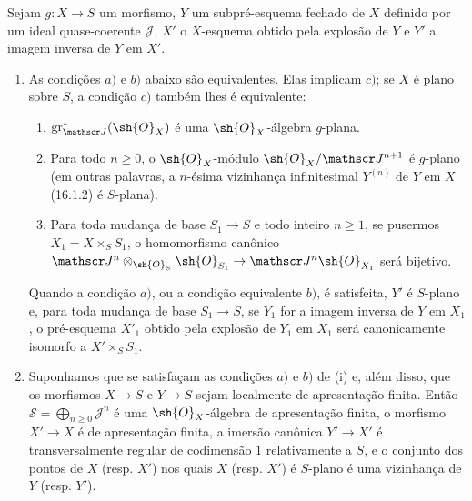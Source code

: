 \begin{proposition}[19.4.6]
\label{IV.19.4.6}
Sejam $g:X\to S$ um morfismo, $Y$ um subpré-esquema fechado de $X$ definido por um ideal quase-coerente $\mathscr J$, $X'$ o $X$-esquema obtido pela explosão de $Y$ e $Y'$ a imagem inversa de $Y$ em $X'$.
\begin{enumerate}
  \item[(i)] As condições $a)$ e $b)$ abaixo são equivalentes. Elas implicam $c)$; se $X$ é plano sobre $S$, a condição $c)$ também lhes é equivalente:
  \begin{enumerate}
    \item[a)] $\operatorname{gr}_{\mathscr J}^*(\sh{O}_X)$ é uma $\sh{O}_X$-álgebra $g$-plana.
    \item[b)] Para todo $n\geq0$, o $\sh{O}_X$-módulo $\sh{O}_X/\mathscr J^{n+1}$ é $g$-plano (em outras palavras, a $n$-ésima vizinhança infinitesimal $Y^{(n)}$ de $Y$ em $X$ (16.1.2) é $S$-plana).
    \item[c)] Para toda mudança de base $S_1\to S$ e todo inteiro $n\geq1$, se pusermos $X_1=X\times_S S_1$, o homomorfismo canônico $\mathscr J^n\otimes_{\sh{O}_S}\sh{O}_{S_1}\to\mathscr J^n\sh{O}_{X_1}$ será bijetivo.
  \end{enumerate}
  Quando a condição $a)$, ou a condição equivalente $b)$, é satisfeita, $Y'$ é $S$-plano e, para toda mudança de base $S_1\to S$, se $Y_1$ for a imagem inversa de $Y$ em $X_1$, o pré-esquema $X'_1$ obtido pela explosão de $Y_1$ em $X_1$ será canonicamente isomorfo a $X'\times_S S_1$.
  \item[(ii)] Suponhamos que se satisfaçam as condições $a)$ e $b)$ de (i) e, além disso, que os morfismos $X\to S$ e $Y\to S$ sejam localmente de apresentação finita. Então $\mathscr S=\bigoplus_{n\geq0}\mathscr J^n$ é uma $\sh{O}_X$-álgebra de apresentação finita, o morfismo $X'\to X$ é de apresentação finita, a imersão canônica $Y'\to X'$ é transversalmente regular de codimensão $1$ relativamente a $S$, e o conjunto dos pontos de $X$ (resp. $X'$) nos quais $X$ (resp. $X'$) é $S$-plano é uma vizinhança de $Y$ (resp. $Y'$).
\end{enumerate}
\end{proposition}

